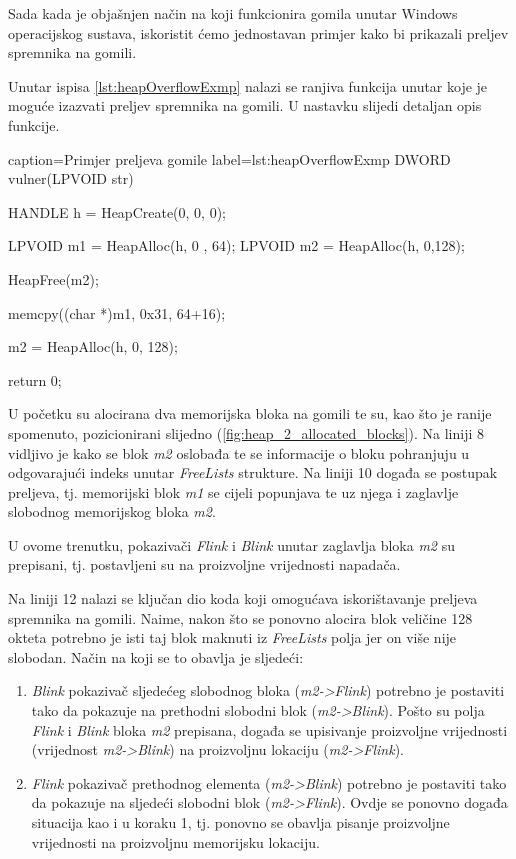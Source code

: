 \documentclass[times, utf8, diplomski, numeric]{fer}
\begin{document}
Sada kada je objašnjen način na koji funkcionira gomila unutar
Windows operacijskog sustava, iskoristit ćemo jednostavan primjer
kako bi prikazali preljev spremnika na gomili.

Unutar ispisa \ref{lst:heapOverflowExmp} nalazi se ranjiva
funkcija unutar koje je moguće izazvati preljev spremnika na
gomili. U nastavku slijedi detaljan opis funkcije.

\begin{ispis} {caption=Primjer preljeva gomile} {label=lst:heapOverflowExmp}
DWORD vulner(LPVOID str)
{
    HANDLE h = HeapCreate(0, 0, 0);
 
    LPVOID m1 = HeapAlloc(h, 0 , 64);
    LPVOID m2 = HeapAlloc(h, 0,128);
 
    HeapFree(m2);

    memcpy((char *)m1, 0x31, 64+16);
 
    m2 = HeapAlloc(h, 0, 128);
 
    return 0;
}
\end{ispis}

U početku su alocirana dva memorijska bloka na gomili te su, kao
što je ranije spomenuto, pozicionirani slijedno 
(\ref{fig:heap_2_allocated_blocks}). Na liniji 8 vidljivo je kako			%
se blok \emph{m2} oslobađa te se informacije o bloku pohranjuju u
odgovarajući indeks unutar \emph{FreeLists} strukture.	Na liniji			%
10 događa se postupak preljeva, tj. memorijski blok \emph{m1} se
cijeli popunjava te uz njega i zaglavlje slobodnog memorijskog
bloka \emph{m2}.

U ovome trenutku, pokazivači \emph{Flink} i \emph{Blink} unutar
zaglavlja bloka \emph{m2} su prepisani, tj. postavljeni su na
proizvoljne vrijednosti napadača.

Na liniji 12 nalazi se ključan dio koda koji omogućava
iskorištavanje preljeva spremnika na gomili. Naime, nakon što se
ponovno alocira blok veličine 128 okteta potrebno je isti taj
blok maknuti iz \emph{FreeLists} polja jer on više nije slobodan.
Način na koji se to obavlja je sljedeći:

\begin{enumerate}

\item \emph{Blink} pokazivač sljedećeg slobodnog bloka
(\emph{m2->Flink}) potrebno je postaviti tako da pokazuje na
prethodni slobodni blok (\emph{m2->Blink}). Pošto su polja
\emph{Flink} i \emph{Blink} bloka \emph{m2} prepisana, događa se
upisivanje proizvoljne vrijednosti (vrijednost \emph{m2->Blink})
na proizvoljnu lokaciju (\emph{m2->Flink}).

\item \emph{Flink} pokazivač prethodnog elementa
(\emph{m2->Blink}) potrebno je postaviti tako da pokazuje na
sljedeći slobodni blok (\emph{m2->Flink}). Ovdje se ponovno
događa situacija kao i u koraku 1, tj. ponovno se obavlja pisanje
proizvoljne vrijednosti na proizvoljnu memorijsku lokaciju.

\end{enumerate}
\end{document}
